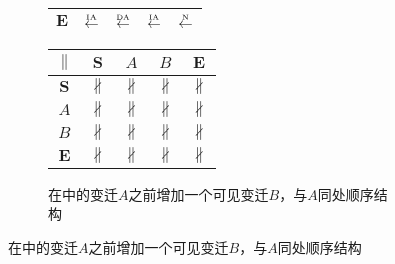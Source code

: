 \begin{figure}[htbp]
\begin{subfigure}{1\textwidth}
\begin{minipage}[b]{0.3\textwidth}
\begin{tabular}{|c|c|c|c|c|}
        $\bm{E}$ & $\overset{\text{\tiny{IA}}}{\leftarrow}$ & $\overset{\text{\tiny{DA}}}{\leftarrow}$ & $\overset{\text{\tiny{IA}}}{\leftarrow}$ & $\overset{\text{\tiny{N}}}{\leftarrow}$\\ \hline
      \end{tabular}
    \end{minipage}
    \begin{minipage}[b]{0.3\textwidth}
      \vspace{1em}
      \centering
      \begin{tabular}{|c|c|c|c|c|} \hline
        $\parallel$ & $\bm{S}$ & $A$ & $B$ & $\bm{E}$\\ \hline
        $\bm{S}$ & $\nparallel$ & $\nparallel$ & $\nparallel$ & $\nparallel$\\ \hline
        $A$ & $\nparallel$ & $\nparallel$ & $\nparallel$ & $\nparallel$\\ \hline
        $B$ & $\nparallel$ & $\nparallel$ & $\nparallel$ & $\nparallel$\\ \hline
        $\bm{E}$ & $\nparallel$ & $\nparallel$ & $\nparallel$ & $\nparallel$\\ \hline
      \end{tabular}
    \end{minipage}
    \caption{在中的变迁$A$之前增加一个可见变迁$B$，与$A$同处顺序结构}
    \label{fig:uniqueness_2_c}
  \end{subfigure}


\end{figure}
